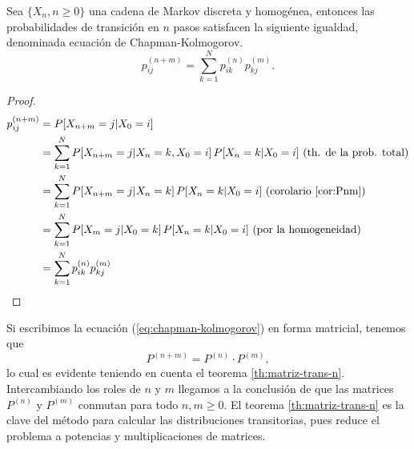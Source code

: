\begin{teorema}
    Sea $\{X_n,n\geq 0\}$ una cadena de Markov discreta y homogénea, entonces las probabilidades de transición en $n$ pasos satisfacen la siguiente igualdad, denominada ecuación de Chapman-Kolmogorov.
    \begin{equation}
        \label{eq:chapman-kolmogorov}
        p_{ij}^{(n+m)}=\sum_{k=1}^N p_{ik}^{(n)}p_{kj}^{(m)}.
    \end{equation} 
\end{teorema}
\begin{proof}
    \begin{equation*}
        \begin{split}
            p_{ij}^{(n+m)} &= P[X_{n+m}=j|X_0=i] \\
            &= \sum_{k=1}^N P[X_{n+m}=j|X_n=k,X_0=i]\,P[X_n=k|X_0=i]\text{ (th. de la prob. total)}\\
            &= \sum_{k=1}^N P[X_{n+m}=j|X_n=k]\,P[X_n=k|X_0=i]\text{ (corolario \ref{cor:Pnm})}\\
            &= \sum_{k=1}^N P[X_{m}=j|X_0=k]\,P[X_n=k|X_0=i]\text{ (por la homogeneidad)}\\
            &= \sum_{k=1}^N p_{ik}^{(n)} p_{kj}^{(m)}
        \end{split}
    \end{equation*}
\end{proof}

Si escribimos la ecuación (\ref{eq:chapman-kolmogorov}) en forma matricial, tenemos que
$$
P^{(n+m)}=P^{(n)}\cdot P^{(m)},
$$
lo cual es evidente teniendo en cuenta el teorema \ref{th:matriz-trans-n}. Intercambiando los roles de $n$ y $m$ llegamos a la conclusión de que las matrices $P^{(n)}$ y $P^{(m)}$ conmutan para todo $n,m\geq 0$. El teorema \ref{th:matriz-trans-n} es la clave del método para calcular las distribuciones transitorias, pues reduce el problema a potencias y multiplicaciones de matrices.

